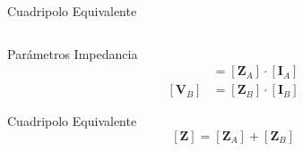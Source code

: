 \documentclass[aspectratio=169, usenames,svgnames,dvipsnames]{beamer}
\begin{document}
\begin{frame}[label={sec:org144cb4f}]{Cuadripolo Equivalente}
\begin{columns}
\begin{column}{0.35\columnwidth}
\begin{block}{Parámetros Impedancia}
\begin{align*}
  [\mathbf{V}_A] &= [\mathbf{Z}_A] \cdot [\mathbf{I}_A]\\
  [\mathbf{V}_B] &= [\mathbf{Z}_B] \cdot [\mathbf{I}_B]
\end{align*}
\end{block}

\begin{block}{Cuadripolo Equivalente}
\[
  \boxed{[\mathbf{Z}] = [\mathbf{Z}_A] + [\mathbf{Z}_B]}
\]
\end{block}
\end{column}
\end{columns}
\end{frame}
\end{document}
